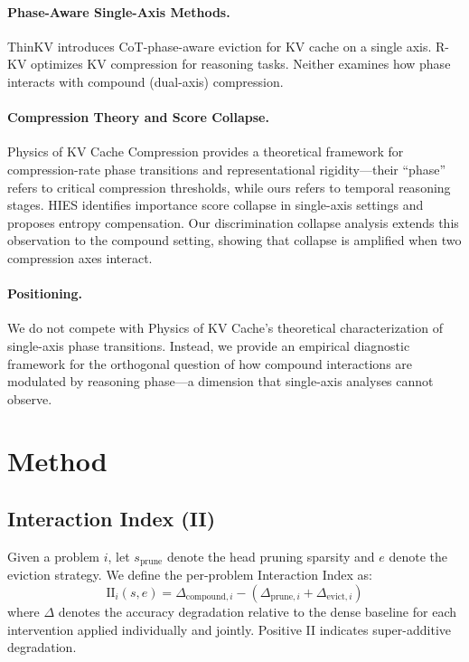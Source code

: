 \documentclass[11pt,a4paper]{article}
\begin{document}
\paragraph{Phase-Aware Single-Axis Methods.}
ThinKV \cite{thinkv2025} introduces CoT-phase-aware eviction for KV cache on a single axis. R-KV \cite{rkv2025} optimizes KV compression for reasoning tasks. Neither examines how phase interacts with compound (dual-axis) compression.

\paragraph{Compression Theory and Score Collapse.}
Physics of KV Cache Compression \cite{physicskv2026} provides a theoretical framework for compression-rate phase transitions and representational rigidity---their ``phase'' refers to critical compression thresholds, while ours refers to temporal reasoning stages. HIES \cite{hies2025} identifies importance score collapse in single-axis settings and proposes entropy compensation. Our discrimination collapse analysis extends this observation to the compound setting, showing that collapse is amplified when two compression axes interact.

\paragraph{Positioning.} We do not compete with Physics of KV Cache's theoretical characterization of single-axis phase transitions. Instead, we provide an empirical diagnostic framework for the orthogonal question of how compound interactions are modulated by reasoning phase---a dimension that single-axis analyses cannot observe.

\section{Method}

\subsection{Interaction Index (II)}

Given a problem $i$, let $s_{\text{prune}}$ denote the head pruning sparsity and $e$ denote the eviction strategy. We define the per-problem Interaction Index as:
\begin{equation}
\text{II}_i(s, e) = \Delta_{\text{compound},i} - (\Delta_{\text{prune},i} + \Delta_{\text{evict},i})
\end{equation}
where $\Delta$ denotes the accuracy degradation relative to the dense baseline for each intervention applied individually and jointly. Positive II indicates super-additive degradation.
\end{document}
